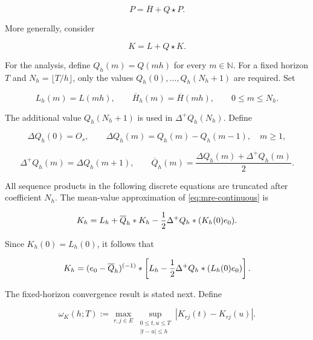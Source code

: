 \documentclass[3p,12pt,authoryear]{elsarticle}
\theoremstyle{definition}
\theoremstyle{remark}
\newcommand{\N}{\mathbb N}
\newcommand{\ez}{e_{\mathstrut 0}}
\begin{document}
\begin{equation}\label{eq:transition-continuous}
P=\overline H+Q\star P.
\end{equation}

More generally, consider

\begin{equation}\label{eq:mre-continuous}
K=L+Q\star K.
\end{equation}

For the analysis, define $Q_h(m)=Q(mh)$ for every $m\in\N$. For a fixed horizon $T$ and $N_h=\lfloor T/h\rfloor$, only the values $Q_h(0),\ldots,Q_h(N_h+1)$ are required. Set

\begin{equation*}
L_h(m)=L(mh),
\qquad
\overline H_h(m)=\overline H(mh),
\qquad
0\leq m\leq N_h.
\end{equation*}

The additional value $Q_h(N_h+1)$ is used in $\Delta^+Q_h(N_h)$. Define

\begin{equation*}
\Delta Q_h(0)=O_s,
\qquad
\Delta Q_h(m)=Q_h(m)-Q_h(m-1),
\quad m\geq1,
\end{equation*}


\begin{equation*}
\Delta^+Q_h(m)=\Delta Q_h(m+1),
\qquad
\overline Q_h(m)=\frac{\Delta Q_h(m)+\Delta^+Q_h(m)}{2}.
\end{equation*}

All sequence products in the following discrete equations are truncated after coefficient $N_h$. The mean-value approximation of \eqref{eq:mre-continuous} is

\begin{equation}\label{eq:mre-discrete}
K_h
=
L_h+\overline Q_h*K_h
-
\frac12\Delta^+Q_h*(K_h(0)\ez).
\end{equation}

Since $K_h(0)=L_h(0)$, it follows that

\begin{equation}\label{eq:mre-solution}
K_h
=
(\ez-\overline Q_h)^{(-1)}*
\left[L_h-\frac12\Delta^+Q_h*(L_h(0)\ez)\right].
\end{equation}


The fixed-horizon convergence result is stated next. Define

\begin{equation*}
\omega_K(h;T)
:=
\max_{r,j\in E}
\sup_{\substack{0\leq t,u\leq T\\ |t-u|\leq h}}
|K_{rj}(t)-K_{rj}(u)|.
\end{equation*}
\end{document}
